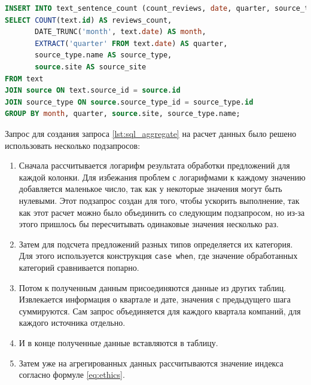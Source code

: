 \documentclass[PI, VKR]{HSEUniversity}
\begin{document}
\begin{lstlisting}[language=SQL,label=lst:count_reviews,caption={SQL запрос на подсчет количества предложений},captionpos=b,numbers=none]
INSERT INTO text_sentence_count (count_reviews, date, quarter, source_type, source_site)
SELECT COUNT(text.id) AS reviews_count,
       DATE_TRUNC('month', text.date) AS month,
       EXTRACT('quarter' FROM text.date) AS quarter,
       source_type.name AS source_type,
       source.site AS source_site
FROM text
JOIN source ON text.source_id = source.id
JOIN source_type ON source.source_type_id = source_type.id
GROUP BY month, quarter, source.site, source_type.name;
\end{lstlisting}

Запрос для создания запроса \ref{lst:sql_aggregate} на расчет данных было решено использовать несколько подзапросов:
\begin{enumerate}
\item Сначала рассчитывается логарифм результата обработки предложений для каждой колонки. Для избежания проблем с логарифмами к каждому значению добавляется маленькое число, так как у некоторые значения могут быть нулевыми. Этот подзапрос создан для того, чтобы ускорить выполнение, так как этот расчет можно было объединить со следующим подзапросом, но из-за этого пришлось бы пересчитывать одинаковые значения несколько раз.
\item Затем для подсчета предложений разных типов определяется их категория. Для этого используется конструкция \texttt{case when}, где значение обработанных категорий сравнивается попарно.
\item Потом к полученным данным присоединяются данные из других таблиц. Извлекается информация о квартале и дате, значения с предыдущего шага суммируются. Сам запрос объединяется для каждого квартала компаний, для каждого источника отдельно.
\item И в конце полученные данные вставляются в таблицу.
\item Затем уже на агрегированных данных рассчитываются значение индекса согласно формуле \ref{eq:ethics}.
\end{enumerate}
\end{document}
